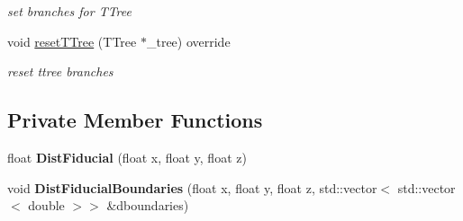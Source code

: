 \begin{DoxyCompactItemize}
\begin{DoxyCompactList}\small\item\em set branches for T\+Tree \end{DoxyCompactList}\item 
void \hyperlink{classanalysis_1_1ContainmentAnalysis_a6e5a6d76850458abc42a252cec25063f}{reset\+T\+Tree} (T\+Tree $\ast$\+\_\+tree) override\hypertarget{classanalysis_1_1ContainmentAnalysis_a6e5a6d76850458abc42a252cec25063f}{}\label{classanalysis_1_1ContainmentAnalysis_a6e5a6d76850458abc42a252cec25063f}

\begin{DoxyCompactList}\small\item\em reset ttree branches \end{DoxyCompactList}\end{DoxyCompactItemize}
\subsection*{Private Member Functions}
\begin{DoxyCompactItemize}
\item 
float {\bfseries Dist\+Fiducial} (float x, float y, float z)\hypertarget{classanalysis_1_1ContainmentAnalysis_af1ae4a6e17c26624f1ffc789a1a28370}{}\label{classanalysis_1_1ContainmentAnalysis_af1ae4a6e17c26624f1ffc789a1a28370}

\item 
void {\bfseries Dist\+Fiducial\+Boundaries} (float x, float y, float z, std\+::vector$<$ std\+::vector$<$ double $>$$>$ \&dboundaries)\hypertarget{classanalysis_1_1ContainmentAnalysis_a403e7651d9e20b4f672232e05a967472}{}\label{classanalysis_1_1ContainmentAnalysis_a403e7651d9e20b4f672232e05a967472}

\end{DoxyCompactItemize}
